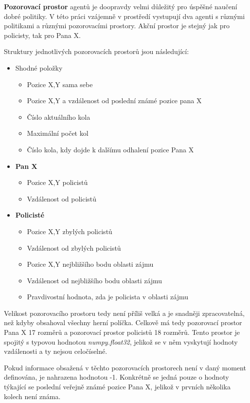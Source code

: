 \textbf{Pozorovací prostor} agentů je doopravdy velmi důležitý pro úspěšné naučení dobré politiky.
V této práci vzájemně v prostředí vystupují dva agenti s různými politikami a různými pozorovacími prostory.
Akční prostor je stejný jak pro policisty, tak pro Pana X\@.

Struktury jednotlivých pozorovacích prostorů jsou následující:

\begin{itemize}
  \item Shodné položky
    \begin{itemize}
    \item Pozice X,Y sama sebe
    \item Pozice X,Y a vzdálenost od poslední známé pozice pana X
    \item Číslo aktuálního kola
    \item Maximální počet kol
    \item Číslo kola, kdy dojde k dalšímu odhalení pozice Pana X
  \end{itemize}
  \item \textbf{Pan X}
    \begin{itemize}
    \item Pozice X,Y policistů
    \item Vzdálenost od  policistů
  \end{itemize}
  \item \textbf{Policisté}
    \begin{itemize}
    \item Pozice X,Y zbylých policistů
    \item Vzdálenost od zbylých policistů
    \item Pozice X,Y nejbližšího bodu oblasti zájmu
    \item Vzdálenost od nejbližšího bodu oblasti zájmu
    \item Pravdivostní hodnota, zda je policista v oblasti zájmu
  \end{itemize}
\end{itemize}

Velikost pozorovacího prostoru tedy není příliš velká a je snadněji zpracovatelná, než kdyby obsahoval všechny herní políčka.
Celkově má tedy pozorovací prostor Pana X 17 rozměrů a pozorovací prostor policistů 18 rozměrů.
Tento prostor je spojitý s typovou hodnotou \emph{numpy.float32}, jelikož se v něm vyskytují hodnoty vzdálenosti a ty nejsou celočíselné.

Pokud informace obsažená v těchto pozorovacích prostorech není v daný moment definována, je nahrazena hodnotou -1.
Konkrétně se jedná pouze o hodnoty týkající se poslední veřejně známé pozice Pana X, jelikož v prvních několika kolech není známa.

